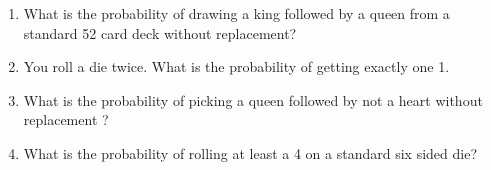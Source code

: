 \documentclass[12pt]{article}
\begin{document}
\begin{enumerate}
\item What is the probability of drawing a king followed by a queen from a standard 52 card deck without replacement?\\   %
\vspace{2em}

\item You roll a die twice. What is the probability of getting exactly one 1. \\  %
\vspace{2em}

\item What is the probability of picking a queen followed by not a heart without replacement ?\\  %
\vspace{2em}

\item What is the probability of rolling at least a 4 on a standard six sided die?\\  %
\vspace{2em}

\end{enumerate}
\end{document}
